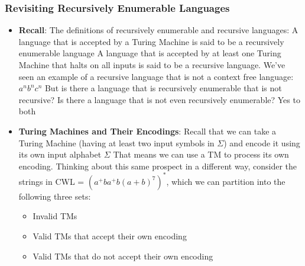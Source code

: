 \documentclass{report}
\begin{document}
    \subsubsection{Revisiting Recursively Enumerable Languages}
    \begin{itemize}
        \item \textbf{Recall}:  The definitions of recursively enumerable and recursive languages: A language that is accepted by a Turing Machine is said to be a recursively enumerable language
            \bigbreak \noindent 
            A language that is accepted by at least one Turing Machine that halts on all inputs is said to be a recursive language.
            \bigbreak \noindent 
            \bigbreak \noindent 
            We've seen an example of a recursive language that is not a context free language: $a^{n}b^{n}c^{n}$
            \bigbreak \noindent 
            But is there a language that is recursively enumerable that is not recursive? Is there a language that is not even recursively enumerable?
            \bigbreak \noindent 
            Yes to both 
        \item \textbf{Turing Machines and Their Encodings}: Recall that we can take a Turing Machine (having at least two input symbols in $\Sigma$) and encode it using its own input alphabet $\Sigma$
            \bigbreak \noindent 
            That means we can use a TM to process its own encoding.
            \bigbreak \noindent 
            Thinking about this same prospect in a different way, consider the strings in CWL = $(a^{+}ba^{+}b(a+b)^{7})^{*}$, which we can partition into the following three sets:
            \begin{itemize}
                \item Invalid TMs
                \item Valid TMs that accept their own encoding
                \item Valid TMs that do not accept their own encoding


\end{itemize}
\end{itemize}
\end{document}
